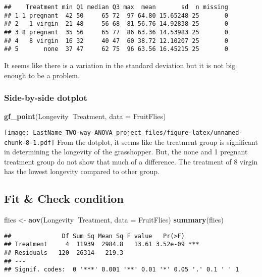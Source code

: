 \documentclass[]{article}
\newenvironment{Shaded}{\begin{snugshade}}{\end{snugshade}}
\newcommand{\DataTypeTok}[1]{\textcolor[rgb]{0.13,0.29,0.53}{#1}}
\newcommand{\KeywordTok}[1]{\textcolor[rgb]{0.13,0.29,0.53}{\textbf{#1}}}
\newcommand{\NormalTok}[1]{#1}
\newcommand{\OperatorTok}[1]{\textcolor[rgb]{0.81,0.36,0.00}{\textbf{#1}}}
\newcommand{\StringTok}[1]{\textcolor[rgb]{0.31,0.60,0.02}{#1}}
\begin{document}
\begin{verbatim}
##    Treatment min Q1 median Q3 max  mean       sd  n missing
## 1 1 pregnant  42 50     65 72  97 64.80 15.65248 25       0
## 2   1 virgin  21 48     56 68  81 56.76 14.92838 25       0
## 3 8 pregnant  35 56     65 77  86 63.36 14.53983 25       0
## 4   8 virgin  16 32     40 47  60 38.72 12.10207 25       0
## 5       none  37 47     62 75  96 63.56 16.45215 25       0
\end{verbatim}

It seems like there is a variation in the standard deviation but it is
not big enough to be a problem.

\hypertarget{side-by-side-dotplot-1}{%
\subsubsection{Side-by-side dotplot}\label{side-by-side-dotplot-1}}

\begin{Shaded}
\begin{Highlighting}[]
\KeywordTok{gf_point}\NormalTok{(Longevity}\OperatorTok{~}\NormalTok{Treatment, }\DataTypeTok{data =}\NormalTok{ FruitFlies)}
\end{Highlighting}
\end{Shaded}

\texttt{[image: LastName\_TWO-way-ANOVA\_project\_files/figure-latex/unnamed-chunk-8-1.pdf]}
From the dotplot, it seems like the treatment group is significant in
determining the longevity of the grasshopper. But, the none and 1
pregnant treatment group do not show that much of a difference. The
treatment of 8 virgin has the lowest longevity compared to other group.

\hypertarget{fit-check-condition-1}{%
\subsection{Fit \& Check condition}\label{fit-check-condition-1}}

\begin{Shaded}
\begin{Highlighting}[]
\NormalTok{flies <-}\StringTok{ }\KeywordTok{aov}\NormalTok{(Longevity}\OperatorTok{~}\NormalTok{Treatment, }\DataTypeTok{data =}\NormalTok{ FruitFlies)}
\KeywordTok{summary}\NormalTok{(flies)}
\end{Highlighting}
\end{Shaded}

\begin{verbatim}
##              Df Sum Sq Mean Sq F value   Pr(>F)    
## Treatment     4  11939  2984.8   13.61 3.52e-09 ***
## Residuals   120  26314   219.3                     
## ---
## Signif. codes:  0 '***' 0.001 '**' 0.01 '*' 0.05 '.' 0.1 ' ' 1
\end{verbatim}
\end{document}
